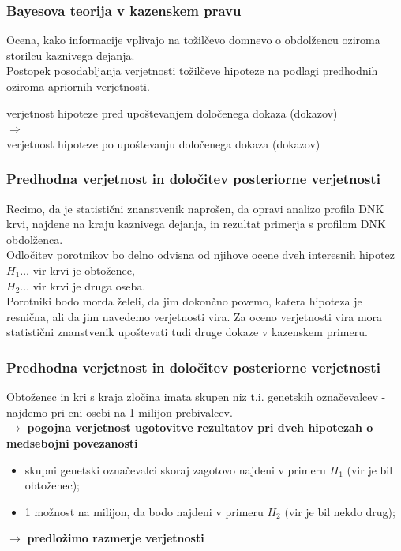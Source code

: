 \documentclass{beamer}
\begin{document}
\begin{frame}
    \frametitle{Bayesova teorija v kazenskem pravu}
    Ocena, kako informacije vplivajo na tožilčevo domnevo o obdolžencu oziroma storilcu kaznivega dejanja. \\ \vspace{3mm}
    Postopek posodabljanja verjetnosti tožilčeve hipoteze na podlagi predhodnih oziroma apriornih verjetnosti. \\ \vspace{3mm}
    \begin{block}{}
        \centering
        verjetnost hipoteze pred upoštevanjem določenega dokaza (dokazov) \\ \vspace{2mm}
        $\Rightarrow$ \\ \vspace{3mm}
        verjetnost hipoteze po upoštevanju določenega dokaza (dokazov)
    \end{block}
\end{frame}

\begin{frame}
    \frametitle{Predhodna verjetnost in določitev posteriorne verjetnosti}
    Recimo, da je statistični znanstvenik naprošen, da opravi analizo profila DNK krvi, najdene na kraju kaznivega dejanja, in rezultat primerja s profilom DNK 
    obdolženca.\\ \vspace{3mm}
    Odločitev porotnikov bo delno odvisna od njihove ocene dveh interesnih
    hipotez\\
    $H_1 \dots$ vir krvi je obtoženec,\\
    $H_2 \dots$ vir krvi je druga oseba.\\ \vspace{3mm}
    Porotniki bodo morda želeli, da jim dokončno povemo, katera hipoteza je resnična, ali da jim navedemo verjetnosti vira. Za oceno verjetnosti 
    vira mora statistični znanstvenik upoštevati tudi druge dokaze v kazenskem primeru.
\end{frame}

\begin{frame}
    \frametitle{Predhodna verjetnost in določitev posteriorne verjetnosti}
    Obtoženec in kri s kraja zločina imata skupen niz t.i. genetskih označevalcev - najdemo pri eni osebi na 1 milijon prebivalcev.\\ \vspace{3mm}
    \centering
    $\rightarrow$ \textbf{pogojna verjetnost ugotovitve rezultatov pri dveh hipotezah o medsebojni povezanosti}
    \begin{itemize}
        \item skupni genetski označevalci skoraj zagotovo najdeni v primeru $H_1$ (vir je bil obtoženec);
        \item 1 možnost na milijon, da bodo najdeni v primeru $H_2$ (vir je bil nekdo drug);
    \end{itemize}
    \centering 
    $\rightarrow$ \textbf{predložimo razmerje verjetnosti}
\end{frame}
\end{document}
